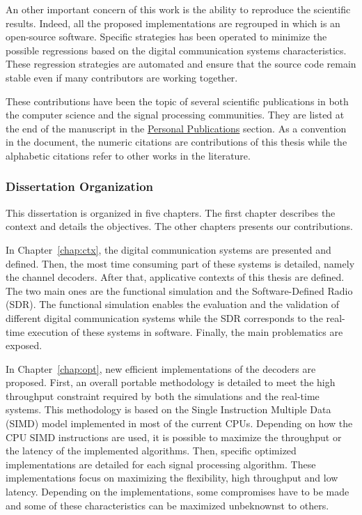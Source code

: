 An other important concern of this work is the ability to reproduce the
scientific results. Indeed, all the proposed implementations are regrouped in
\AFFECT which is an open-source software. Specific strategies has been operated
to minimize the possible regressions based on the digital communication systems
characteristics. These regression strategies are automated and ensure that the
source code remain stable even if many contributors are working together.

These contributions have been the topic of several scientific publications in
both the computer science and the signal processing communities. They are listed
at the end of the manuscript in the \hyperref[sec:publi]{Personal Publications}
section. As a convention in the document, the numeric citations are
contributions of this thesis while the alphabetic citations refer to other works
in the literature.

\subsubsection*{Dissertation Organization}

This dissertation is organized in five chapters. The first chapter describes the
context and details the objectives. The other chapters presents our
contributions.

In Chapter~\ref{chap:ctx}, the digital communication systems are presented and
defined. Then, the most time consuming part of these systems is detailed, namely
the channel decoders. After that, applicative contexts of this thesis are
defined. The two main ones are the functional simulation and the
Software-Defined Radio (SDR). The functional simulation enables the evaluation
and the validation of different digital communication systems while the SDR
corresponds to the real-time execution of these systems in software. Finally,
the main problematics are exposed.

In Chapter~\ref{chap:opt}, new efficient implementations of the decoders are
proposed. First, an overall portable methodology is detailed to meet the high
throughput constraint required by both the simulations and the real-time
systems. This methodology is based on the Single Instruction Multiple Data
(SIMD) model implemented in most of the current CPUs. Depending on how the CPU
SIMD instructions are used, it is possible to maximize the throughput or the
latency of the implemented algorithms. Then, specific optimized implementations
are detailed for each signal processing algorithm. These implementations focus
on maximizing the flexibility, high throughput and low latency. Depending on the
implementations, some compromises have to be made and some of these
characteristics can be maximized unbeknownst to others.

